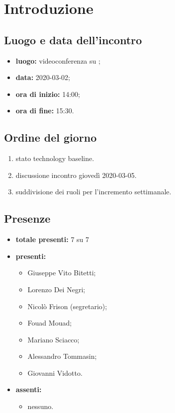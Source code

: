 \section*{Introduzione}

\subsection*{Luogo e data dell'incontro}
	\begin{itemize}
		\item \textbf{luogo:} videoconferenza su ;
		\item \textbf{data:} 2020-03-02;
		\item \textbf{ora di inizio:} 14:00;
		\item \textbf{ora di fine:} 15:30.
	\end{itemize}

\subsection*{Ordine del giorno}
	\begin{enumerate}
			\item stato technology baseline.
			\item discussione incontro giovedì 2020-03-05.
			\item suddivisione dei ruoli per l'incremento settimanale.
	\end{enumerate}

\subsection*{Presenze}
	\begin{itemize}
		\item \textbf{totale presenti:} 7 su 7
		\item \textbf{presenti: }
			\begin{itemize}			
				\item Giuseppe Vito Bitetti;
				\item Lorenzo Dei Negri;
				\item Nicolò Frison (segretario);
				\item Fouad Mouad;
				\item Mariano Sciacco;
				\item Alessandro Tommasin;
				\item Giovanni Vidotto.
			\end{itemize}
		\item \textbf{assenti: } 
			\begin{itemize}
				\item nessuno.
			\end{itemize}
	\end{itemize}



